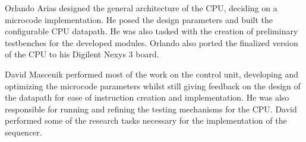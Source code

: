 \label{sec:contribs}
Orlando Arias designed the general architecture of the CPU, deciding on a
microcode implementation. He posed the design parameters and built the
configurable CPU datapath. He was also tasked with the creation of preliminary
testbenches for the developed modules. Orlando also ported the finalized
version of the CPU to his Digilent Nexys 3 board.\par

David Mascenik performed most of the work on the control unit, developing and
optimizing the microcode parameters whilst still giving feedback on the design
of the datapath for ease of instruction creation and implementation. He was
also responsible for running and refining the testing mechanisms for the CPU.
David performed some of the research tasks necessary for the implementation of
the sequencer.\par
